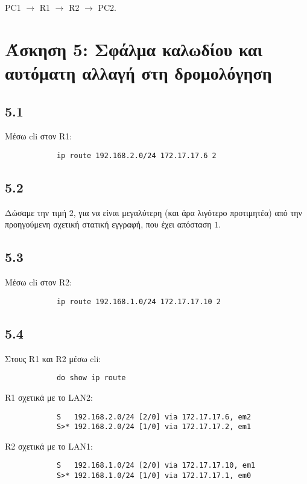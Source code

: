 \documentclass[a4paper, 12pt]{article}
\begin{document}
		PC1 $\rightarrow$ R1 $\rightarrow$ R2 $\rightarrow$ PC2.

\section*{Άσκηση 5: Σφάλμα καλωδίου και αυτόματη αλλαγή στη δρομολόγηση}

	\subsection*{5.1}
		Μέσω cli στον R1:
		
		\begin{verbatim}
			ip route 192.168.2.0/24 172.17.17.6 2
		\end{verbatim}

	\subsection*{5.2}
		 Δώσαμε την τιμή $2$, για να είναι μεγαλύτερη (και άρα λιγότερο προτιμητέα) από την προηγούμενη σχετική στατική εγγραφή, που έχει απόσταση $1$.

	\subsection*{5.3}
		Μέσω cli στον R2:
		
		\begin{verbatim}
			ip route 192.168.1.0/24 172.17.17.10 2
		\end{verbatim}

	\subsection*{5.4}
		Στους R1 και R2 μέσω cli:
		
		\begin{verbatim}
			do show ip route
		\end{verbatim}

		R1 σχετικά με το LAN2:
		
		\begin{verbatim}
			S   192.168.2.0/24 [2/0] via 172.17.17.6, em2
			S>* 192.168.2.0/24 [1/0] via 172.17.17.2, em1
		\end{verbatim}
		
		R2 σχετικά με το LAN1:
		
		\begin{verbatim}
			S   192.168.1.0/24 [2/0] via 172.17.17.10, em1
			S>* 192.168.1.0/24 [1/0] via 172.17.17.1, em0
		\end{verbatim}
	
\end{document}
